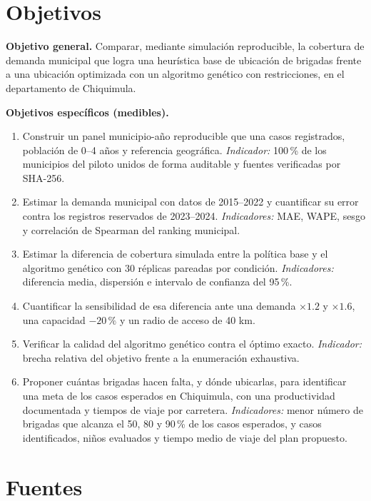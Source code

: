 \documentclass[11pt,letterpaper]{article}
\begin{document}
\section{Objetivos}
\label{sec:objetivos}

\textbf{Objetivo general.} Comparar, mediante simulación reproducible, la cobertura de demanda municipal que logra una heurística base de ubicación de brigadas frente a una ubicación optimizada con un algoritmo genético con restricciones, en el departamento de Chiquimula.

\textbf{Objetivos específicos (medibles).}
\begin{enumerate}[label=O\arabic*.]
  \item Construir un panel municipio-año reproducible que una casos registrados, población de 0--4 años y referencia geográfica. \emph{Indicador:} 100\,\% de los municipios del piloto unidos de forma auditable y fuentes verificadas por SHA-256.
  \item Estimar la demanda municipal con datos de 2015--2022 y cuantificar su error contra los registros reservados de 2023--2024. \emph{Indicadores:} MAE, WAPE, sesgo y correlación de Spearman del ranking municipal.
  \item Estimar la diferencia de cobertura simulada entre la política base y el algoritmo genético con 30 réplicas pareadas por condición. \emph{Indicadores:} diferencia media, dispersión e intervalo de confianza del 95\,\%.
  \item Cuantificar la sensibilidad de esa diferencia ante una demanda $\times1.2$ y $\times1.6$, una capacidad $-20\,\%$ y un radio de acceso de 40 km.
  \item Verificar la calidad del algoritmo genético contra el óptimo exacto. \emph{Indicador:} brecha relativa del objetivo frente a la enumeración exhaustiva.
  \item Proponer cuántas brigadas hacen falta, y dónde ubicarlas, para identificar una meta de los casos esperados en Chiquimula, con una productividad documentada y tiempos de viaje por carretera. \emph{Indicadores:} menor número de brigadas que alcanza el 50, 80 y 90\,\% de los casos esperados, y casos identificados, niños evaluados y tiempo medio de viaje del plan propuesto.
\end{enumerate}

\section{Fuentes}
\label{sec:fuentes}
\end{document}
